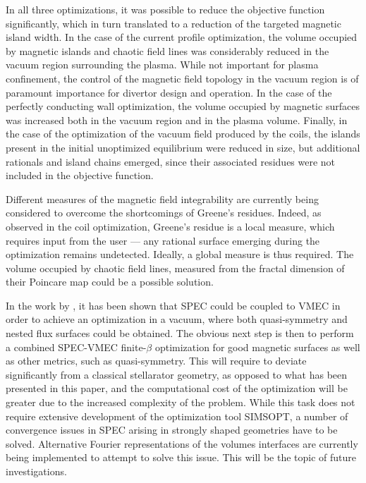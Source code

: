 In all three optimizations, it was possible to reduce the objective function significantly, which in turn translated to a reduction of the targeted magnetic island width. In the case of the current profile optimization, the volume occupied by magnetic islands and chaotic field lines was considerably reduced in the vacuum region surrounding the plasma. While not important for plasma confinement, the control of the magnetic field topology in the vacuum region is of paramount importance for divertor design and operation. In the case of the perfectly conducting wall optimization, the volume occupied by magnetic surfaces was increased both in the vacuum region and in the plasma volume. Finally, in the case of the optimization of the vacuum field produced by the coils, the islands present in the initial unoptimized equilibrium were reduced in size, but additional rationals and island chains emerged, since their associated residues were not included in the objective function. 

Different measures of the magnetic field integrability are currently being considered to overcome the shortcomings of Greene's residues. Indeed, as observed in the coil optimization, Greene's residue is a local measure, which requires input from the user --- any rational surface emerging during the optimization remains undetected. Ideally, a global measure is thus required. The volume occupied by chaotic field lines, measured from the fractal dimension of their Poincare map \cite{Loizu2017} could be a possible solution. 

In the work by \citet{Landreman2021a}, it has been shown that \ac{SPEC} could be coupled to VMEC in order to achieve an optimization in a vacuum, where both quasi-symmetry and nested flux surfaces could be obtained. The obvious next step is then to perform a combined \ac{SPEC}-VMEC finite-$\beta$ optimization for good magnetic surfaces as well as other metrics, such as quasi-symmetry. This will require to deviate significantly from a classical stellarator geometry, as opposed to what has been presented in this paper, and the computational cost of the optimization will be greater due to the increased complexity of the problem. While this task does not require extensive development of the optimization tool SIMSOPT, a number of convergence issues in SPEC arising in strongly shaped geometries have to be solved. Alternative Fourier representations of the volumes interfaces \citep{Henneberg2021} are currently being implemented to attempt to solve this issue. This will be the topic of future investigations.

%
